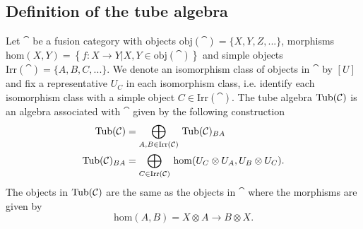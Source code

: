 \subsection{Definition of the tube algebra}

Let $\cat$ be a fusion category with objects $\mathrm{obj}(\cat)=\{X,Y,Z,...\}$, morphisms $\mathrm{hom}(X,Y)=\left\{f:X\rightarrow Y\vert X,Y\in\mathrm{obj}(\cat)\right\}$ and simple objects $\mathrm{Irr}(\cat)=\{A,B,C,...\}$. We denote an isomorphism class of objects in $\cat$ by $[U]$ and fix a representative $U_C$ in each isomorphism class, i.e. identify each isomorphism class with a simple object $C\in \mathrm{Irr}(\cat)$. The tube algebra $\mathrm{Tub}(\mathcal{C})$ is an algebra associated with $\cat$ given by the following construction
\begin{align}
	\mathrm{Tub}(\mathcal{C})&=\bigoplus_{A,B\in\mathrm{Irr}(\mathcal{C})}\,\mathrm{Tub}(\mathcal{C})_{BA}\\
	\mathrm{Tub}(\mathcal{C})_{BA}&=\bigoplus_{C\in\mathrm{Irr}(\mathcal{C})}\, \mathrm{hom}(U_C\otimes U_A,U_B\otimes U_C).
\end{align}
\noindent
The objects in $\mathrm{Tub}(\mathcal{C})$ are the same as the objects in $\cat$ where the morphisms are given by
\begin{equation}
	\mathrm{hom}(A,B)=X\otimes A\rightarrow B\otimes X.
\end{equation}